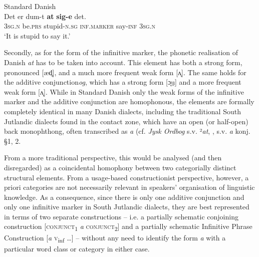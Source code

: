 \documentclass[output=paper]{langsci/langscibook}
\begin{document}
\ea\label{ex:hoeder:9}
	Standard Danish\\
	\gll Det er dum-t \textbf{at} \textbf{sig-e} det.\\
     3\textsc{sg.n} be.\textsc{prs} stupid-\textsc{n.sg} \textsc{inf.marker} say-\textsc{inf} 3\textsc{sg.n}\\
	\glt `It is stupid to say it.'
\z

Secondly, as for the form of the infinitive marker, the phonetic realisation of Danish \textit{at} has to be taken into account. This element has both a strong form, pronounced {[}æd̥{]}, and a much more frequent weak form {[}ʌ̞{]}. The same holds for the additive conjunction\textit{og}, which has a strong form {[}ɔ̞u̯{]} and a more frequent weak form {[}ʌ̞{]}. While in Standard Danish only the weak forms of the infinitive marker and the additive conjunction are homophonous, the elements are formally completely identical in many Danish dialects, including the traditional South Jutlandic dialects found in the contact zone, which have an open (or half-open) back monophthong, often transcribed as \textit{a} (cf. \textit{Jysk Ordbog} s.v. ²\textit{at}, \citealt{BjerrumBjerrum1974}, s.v. \textit{a} konj. \S 1, 2. 

From a more traditional perspective, this would be analysed (and then disregarded) as a coincidental homophony between two categorially distinct structural elements. From a usage-based constructionist perspective, however, a priori categories are not necessarily relevant in speakers’ organisation of linguistic knowledge. As a consequence, since there is only one additive conjunction and only one infinitive marker in South Jutlandic dialects, they are best represented in terms of two separate constructions – i.e. a partially schematic conjoining construction {[}\textsc{conjunct}\textsc{\textsubscript{1}} \textit{a} \textsc{conjunct}\textsc{\textsubscript{2}}{]} and a partially schematic Infinitive Phrase Construction {[}\textit{a} \textsc{v}\textsubscript{inf} …{]} – without any need to identify the form \textit{a} with a particular word class or category in either case.
\end{document}

